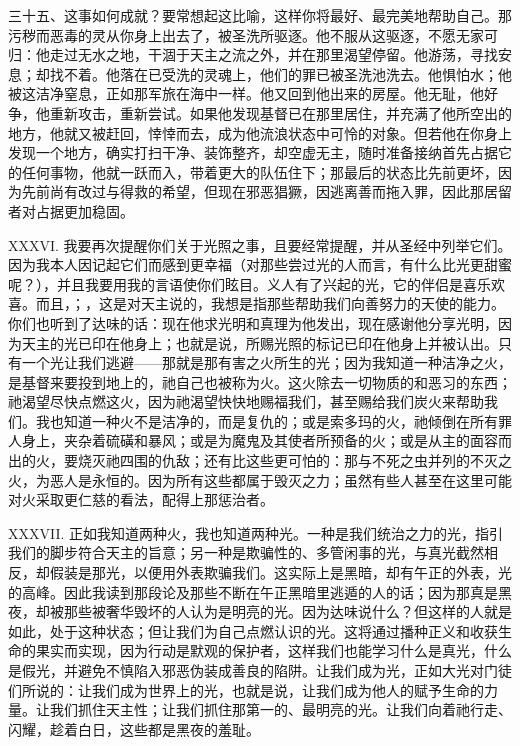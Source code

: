 三十五、这事如何成就？要常想起这比喻，这样你将最好、最完美地帮助自己。那污秽而恶毒的灵从你身上出去了，被圣洗所驱逐。他不服从这驱逐，不愿无家可归：他走过无水之地，干涸于天主之流之外，并在那里渴望停留。他游荡，寻找安息；却找不着。他落在已受洗的灵魂上，他们的罪已被圣洗池洗去。他惧怕水；他被这洁净窒息，正如那军旅在海中一样。他又回到他出来的房屋。他无耻，他好争，他重新攻击，重新尝试。如果他发现基督已在那里居住，并充满了他所空出的地方，他就又被赶回，悻悻而去，成为他流浪状态中可怜的对象。但若他在你身上发现一个地方，确实打扫干净、装饰整齐，却空虚无主，随时准备接纳首先占据它的任何事物，他就一跃而入，带着更大的队伍住下；那最后的状态比先前更坏，因为先前尚有改过与得救的希望，但现在邪恶猖獗，因逃离善而拖入罪，因此那居留者对占据更加稳固。\par

XXXVI. 我要再次提醒你们关于光照之事，且要经常提醒，并从圣经中列举它们。因为我本人因记起它们而感到更幸福（对那些尝过光的人而言，有什么比光更甜蜜呢？），并且我要用我的言语使你们眩目。义人有了兴起的光，它的伴侣是喜乐欢喜。而且，；，这是对天主说的，我想是指那些帮助我们向善努力的天使的能力。你们也听到了达味的话：现在他求光明和真理为他发出，现在感谢他分享光明，因为天主的光已印在他身上；也就是说，所赐光照的标记已印在他身上并被认出。只有一个光让我们逃避——那就是那有害之火所生的光；因为我知道一种洁净之火，是基督来要投到地上的，祂自己也被称为火。这火除去一切物质的和恶习的东西；祂渴望尽快点燃这火，因为祂渴望快快地赐福我们，甚至赐给我们炭火来帮助我们。我也知道一种火不是洁净的，而是复仇的；或是索多玛的火，祂倾倒在所有罪人身上，夹杂着硫磺和暴风；或是为魔鬼及其使者所预备的火；或是从主的面容而出的火，要烧灭祂四围的仇敌；还有比这些更可怕的：那与不死之虫并列的不灭之火，为恶人是永恒的。因为所有这些都属于毁灭之力；虽然有些人甚至在这里可能对火采取更仁慈的看法，配得上那惩治者。\par

XXXVII. 正如我知道两种火，我也知道两种光。一种是我们统治之力的光，指引我们的脚步符合天主的旨意；另一种是欺骗性的、多管闲事的光，与真光截然相反，却假装是那光，以便用外表欺骗我们。这实际上是黑暗，却有午正的外表，光的高峰。因此我读到那段论及那些不断在午正黑暗里逃遁的人的话；因为那真是黑夜，却被那些被奢华毁坏的人认为是明亮的光。因为达味说什么？但这样的人就是如此，处于这种状态；但让我们为自己点燃认识的光。这将通过播种正义和收获生命的果实而实现，因为行动是默观的保护者，这样我们也能学习什么是真光，什么是假光，并避免不慎陷入邪恶伪装成善良的陷阱。让我们成为光，正如大光对门徒们所说的：让我们成为世界上的光，也就是说，让我们成为他人的赋予生命的力量。让我们抓住天主性；让我们抓住那第一的、最明亮的光。让我们向着祂行走、闪耀，趁着白日，这些都是黑夜的羞耻。\par

